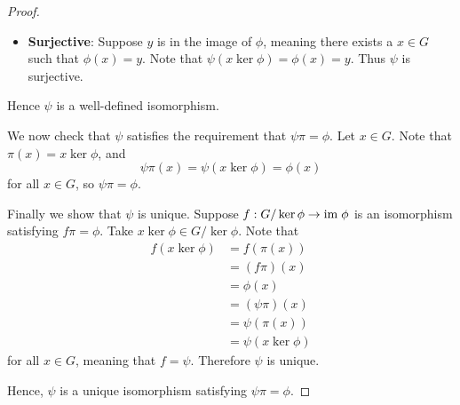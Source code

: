 \begin{proof}
\begin{itemize}
        \item \textbf{Surjective}: Suppose $y$ is in the image of $\phi$, meaning there exists a $x \in G$ such that $\phi(x) = y$. Note that $\psi(x\ker\phi) = \phi(x) = y$. Thus $\psi$ is surjective.
    \end{itemize}
    Hence $\psi$ is a well-defined isomorphism.

    We now check that $\psi$ satisfies the requirement that $\psi\pi = \phi$. Let $x \in G$. Note that $\pi(x) = x\ker\phi$, and
    \[
        \psi\pi(x) = \psi(x\ker\phi) = \phi(x)
    \]
    for all $x \in G$, so $\psi\pi = \phi$.

    Finally we show that $\psi$ is unique. Suppose $f: G/\ker\phi \to \mathrm{im}\;\phi$ is an isomorphism satisfying $f\pi=\phi$. Take $x\ker\phi \in G/\ker\phi$. Note that
    \begin{align*}
        f(x\ker\phi) &= f(\pi(x))\\
        &= (f\pi)(x)\\
        &= \phi(x)\\
        &= (\psi\pi)(x)\\
        &= \psi(\pi(x))\\
        &= \psi(x\ker\phi)
    \end{align*}
    for all $x \in G$, meaning that $f = \psi$. Therefore $\psi$ is unique.

    Hence, $\psi$ is a unique isomorphism satisfying $\psi\pi = \phi$.
\end{proof}

